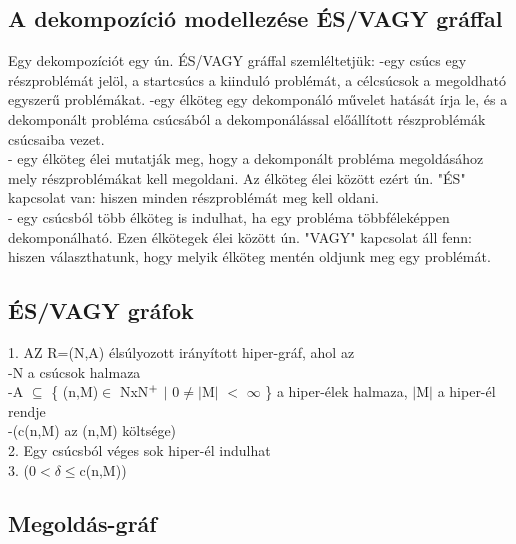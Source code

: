\documentclass{article}
\begin{document}
	 \subsection{A dekompozíció modellezése ÉS/VAGY gráffal}
	 Egy dekompozíciót egy ún. ÉS/VAGY gráffal szemléltetjük:
	 -egy csúcs egy részproblémát jelöl, a startcsúcs a kiinduló problémát, a célcsúcsok a megoldható egyszerű problémákat.
	 -egy élköteg egy dekomponáló művelet hatását írja le, és a dekomponált probléma csúcsából a dekomponálással előállított részproblémák csúcsaiba vezet.\\
	 \hspace*{1em}- egy élköteg élei mutatják meg, hogy a dekomponált probléma megoldásához\\
	 \hspace*{1em}  mely részproblémákat kell megoldani. Az élköteg élei között ezért ún. "ÉS"\\
	 \hspace*{1em}  kapcsolat van: hiszen minden részproblémát meg kell oldani.\\
	 \hspace*{1em}- egy csúcsból több élköteg is indulhat, ha egy probléma többféleképpen\\
	 \hspace*{1em} dekomponálható. Ezen élkötegek élei között ún. "VAGY" kapcsolat áll fenn:\\
	 \hspace*{1em} hiszen választhatunk, hogy melyik élköteg mentén oldjunk meg egy problémát.
	 
	 \subsection{ÉS/VAGY gráfok}
	 1. AZ R=(N,A) élsúlyozott irányított hiper-gráf, ahol az\\
	 \hspace*{1em}-N a csúcsok halmaza\\
	 \hspace*{1em}-A $\subseteq$ \{ (n,M)$\in$ NxN$\textsuperscript{+}$ $|$ 0$\neq$$|$M$|$ $<$ $\infty$ \} a hiper-élek halmaza, $|$M$|$ a hiper-él\\
	 \hspace*{1em} rendje\\
	 \hspace*{1em}-(c(n,M) az (n,M) költsége)\\
	 2. Egy csúcsból véges sok hiper-él indulhat\\
	 3. (0$<$$\delta$$\leq$c(n,M))
	 
	 \subsection{Megoldás-gráf}
	 
	 
	 
	
		
\end{document}
